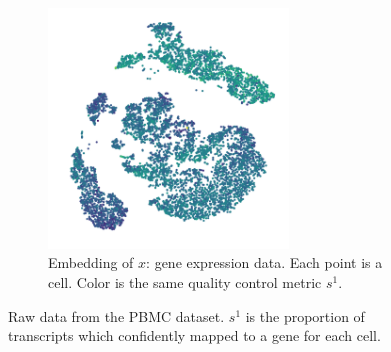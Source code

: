 \begin{figure}[h!]
\begin{subfigure}[t]{0.3\textwidth}
		\includegraphics[width=0.7\textwidth]{figures/qc_5.pdf}
        \caption{Embedding of $x$: gene expression data. Each point is a cell. Color is the same quality control metric $s^1$.}
    \end{subfigure}

        \caption[Raw data from the PBMC dataset]{Raw data from the PBMC dataset. $s^1$ is the proportion of transcripts which confidently mapped to a gene for each cell.}
    \label{hsicpbmc}
\end{figure}